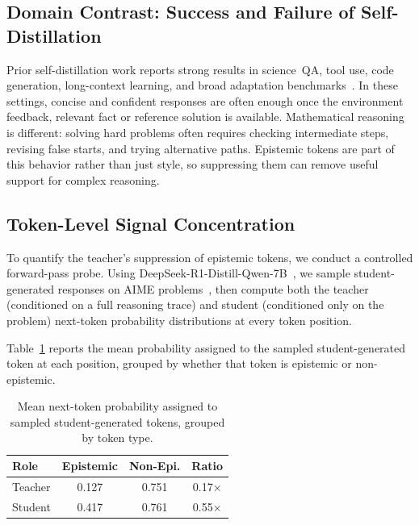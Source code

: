 \documentclass[11pt]{article}
\begin{document}
\subsection{Domain Contrast: Success and Failure of Self-Distillation}

Prior self-distillation work reports strong results in science~QA, tool use, code generation, long-context learning, and broad adaptation benchmarks~\cite{hubotter2026reinforcement,zhang2026opsdl,jin2026unisd,zhang2026simple}.
In these settings, concise and confident responses are often enough once the environment feedback, relevant fact or reference solution is available.
Mathematical reasoning is different: solving hard problems often requires checking intermediate steps, revising false starts, and trying alternative paths.
Epistemic tokens are part of this behavior rather than just style, so suppressing them can remove useful support for complex reasoning.

\subsection{Token-Level Signal Concentration}

To quantify the teacher's suppression of epistemic tokens, we conduct a controlled forward-pass probe.
Using DeepSeek-R1-Distill-Qwen-7B~\cite{guo2025deepseek}, we sample student-generated responses on AIME problems~\cite{maa_aime}, then compute both the teacher (conditioned on a full reasoning trace) and student (conditioned only on the problem) next-token probability distributions at every token position.

Table~\ref{tab:prob_probe} reports the mean probability assigned to the sampled student-generated token at each position, grouped by whether that token is epistemic or non-epistemic.

\begin{table}[ht]
\centering
\small
\begin{tabular}{lccc}
\toprule
\textbf{Role} & \textbf{Epistemic} & \textbf{Non-Epi.} & \textbf{Ratio} \\
\midrule
Teacher  & 0.127 & 0.751 & 0.17$\times$ \\
Student  & 0.417 & 0.761 & 0.55$\times$ \\
\bottomrule
\end{tabular}
\caption{Mean next-token probability assigned to sampled student-generated tokens, grouped by token type.}
\label{tab:prob_probe}
\end{table}
\end{document}

